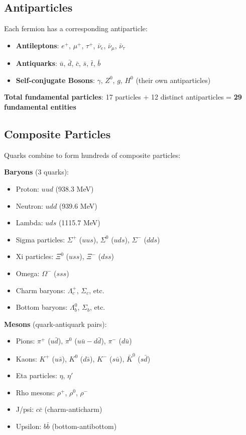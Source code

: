 	\subsection{Antiparticles}
	
	Each fermion has a corresponding antiparticle:
	
	\begin{itemize}
		\item \textbf{Antileptons}: $e^+$, $\mu^+$, $\tau^+$, $\bar{\nu}_e$, $\bar{\nu}_\mu$, $\bar{\nu}_\tau$
		\item \textbf{Antiquarks}: $\bar{u}$, $\bar{d}$, $\bar{c}$, $\bar{s}$, $\bar{t}$, $\bar{b}$
		\item \textbf{Self-conjugate Bosons}: $\gamma$, $Z^0$, $g$, $H^0$ (their own antiparticles)
	\end{itemize}
	
	\textbf{Total fundamental particles}: 17 particles + 12 distinct antiparticles = \textbf{29 fundamental entities}
	
	\subsection{Composite Particles}
	
	Quarks combine to form hundreds of composite particles:
	
	\textbf{Baryons} (3 quarks):
	\begin{itemize}
		\item Proton: $uud$ (938.3 MeV)
		\item Neutron: $udd$ (939.6 MeV)
		\item Lambda: $uds$ (1115.7 MeV)
		\item Sigma particles: $\Sigma^+$ ($uus$), $\Sigma^0$ ($uds$), $\Sigma^-$ ($dds$)
		\item Xi particles: $\Xi^0$ ($uss$), $\Xi^-$ ($dss$)
		\item Omega: $\Omega^-$ ($sss$)
		\item Charm baryons: $\Lambda_c^+$, $\Sigma_c$, etc.
		\item Bottom baryons: $\Lambda_b^0$, $\Sigma_b$, etc.
	\end{itemize}
	
	\textbf{Mesons} (quark-antiquark pairs):
	\begin{itemize}
		\item Pions: $\pi^+$ ($u\bar{d}$), $\pi^0$ ($u\bar{u} - d\bar{d}$), $\pi^-$ ($d\bar{u}$)
		\item Kaons: $K^+$ ($u\bar{s}$), $K^0$ ($d\bar{s}$), $K^-$ ($s\bar{u}$), $\bar{K}^0$ ($s\bar{d}$)
		\item Eta particles: $\eta$, $\eta'$
		\item Rho mesons: $\rho^+$, $\rho^0$, $\rho^-$
		\item J/psi: $c\bar{c}$ (charm-anticharm)
		\item Upsilon: $b\bar{b}$ (bottom-antibottom)
	\end{itemize}
	
